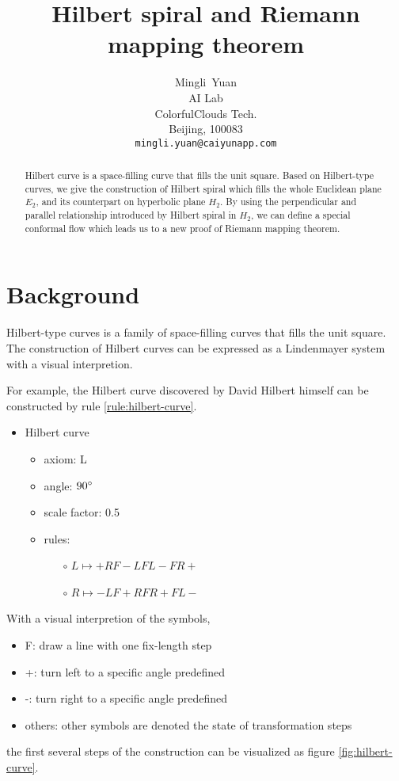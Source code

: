 \documentclass{article}
\title{Hilbert spiral and Riemann mapping theorem}
\author{
  Mingli~Yuan \\
  AI Lab \\
  ColorfulClouds Tech.\\
  Beijing, 100083 \\
  \texttt{mingli.yuan@caiyunapp.com} \\
}
\begin{document}
\maketitle

\begin{abstract}
    Hilbert curve is a space-filling curve that fills the unit square.
    Based on Hilbert-type curves, we give the construction of Hilbert spiral
    which fills the whole Euclidean plane $E_2$, and its counterpart on hyperbolic plane $H_2$.
    By using the perpendicular and parallel relationship introduced by Hilbert spiral in $H_2$,
    we can define a special conformal flow which leads us to a new proof of Riemann mapping theorem.
\end{abstract}


\setcounter{tocdepth}{2}
\tableofcontents

\section{Background}\label{sec:background}

Hilbert-type curves is a family of space-filling curves that fills the unit square.
The construction of Hilbert curves can be expressed as a Lindenmayer system with a visual interpretion.

For example, the Hilbert curve discovered by David Hilbert himself can be constructed by
rule \ref{rule:hilbert-curve}.

\begin{itemize}
    \label{rule:hilbert-curve}
    \item Hilbert curve
    \begin{itemize}
      \item axiom: L
      \item angle: $90\degree$
      \item scale factor: 0.5
      \item rules: \begin{itemize}
          \item[$\circ$] $L \mapsto +RF-LFL-FR+ $
          \item[$\circ$] $R \mapsto -LF+RFR+FL- $
      \end{itemize}
    \end{itemize}
\end{itemize}

With a visual interpretion of the symbols,
\begin{itemize}
  \item F: draw a line with one fix-length step
  \item +: turn left to a specific angle predefined
  \item -: turn right to a specific angle predefined
  \item others: other symbols are denoted the state of transformation steps
\end{itemize}
the first several steps of the construction can be visualized as figure \ref{fig:hilbert-curve}.
\end{document}
